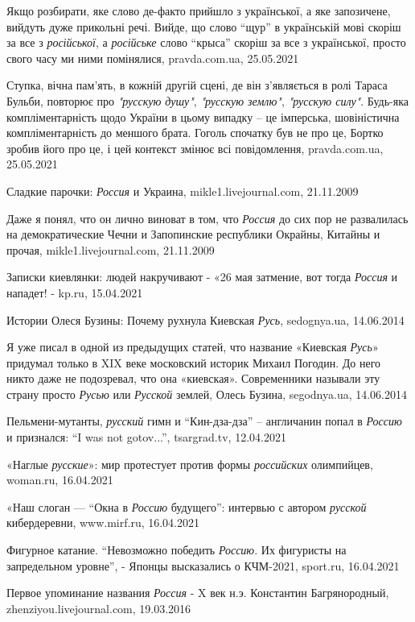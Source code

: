 Якщо розбирати, яке слово де-факто прийшло з української, а яке запозичене,
вийдуть дуже прикольні речі. Вийде, що слово \enquote{щур} в українській мові скоріш за
все з \emph{російської}, а \emph{російське} слово \enquote{крыса} скоріш за все з української, просто
свого часу ми ними помінялися, pravda.com.ua, 25.05.2021

Ступка, вічна пам'ять, в кожній другій сцені, де він з'являється в ролі Тараса
Бульби, повторює про \emph{"русскую душу"}, \emph{"русскую землю"},
\emph{"русскую силу"}. Будь-яка компліментарність щодо України в цьому випадку
– це імперська, шовіністична компліментарність до меншого брата. Гоголь
спочатку був не про це, Бортко зробив його про це, і цей контекст змінює всі
повідомлення, pravda.com.ua, 25.05.2021

Сладкие парочки: \emph{Россия} и Украина, mikle1.livejournal.com, 21.11.2009

Даже я понял, что он лично виноват в том, что \emph{Россия} до сих пор не
развалилась на демократические Чечни и Запопинские республики Окрайны, Китайны
и прочая, mikle1.livejournal.com, 21.11.2009

Записки киевлянки: людей накручивают - «26 мая затмение, вот тогда
\emph{Россия} и нападет! - kp.ru, 15.04.2021

Истории Олеся Бузины: Почему рухнула Киевская \emph{Русь}, sedognya.ua, 14.06.2014

Я уже писал в одной из предыдущих статей, что название «Киевская \emph{Русь}»
придумал только в XIX веке московский историк Михаил Погодин. До него никто
даже не подозревал, что она «киевская». Современники называли эту страну просто
\emph{Русью} или \emph{Русской} землей, Олесь Бузина, segodnya.ua, 14.06.2014

Пельмени-мутанты, \emph{русский} гимн и \enquote{Кин-дза-дза} – англичанин
попал в \emph{Россию} и признался: \enquote{I was not gotov...}, tsargrad.tv,
12.04.2021

«Наглые \emph{русские}»: мир протестует против формы \emph{российских}
олимпийцев, woman.ru, 16.04.2021

«Наш слоган — \enquote{Окна в \emph{Россию} будущего}: интервью с автором \emph{русской}
кибердеревни, www.mirf.ru, 16.04.2021

Фигурное катание. \enquote{Невозможно победить \emph{Россию}. Их фигуристы на
запредельном уровне}, - Японцы высказались о КЧМ-2021, sport.ru, 16.04.2021

Первое упоминание названия \emph{Россия} - X век н.э. Константин
Багрянородный, zhenziyou.livejournal.com, 19.03.2016

